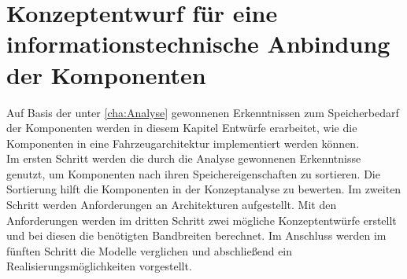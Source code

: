 \chapter{Konzeptentwurf für eine informationstechnische Anbindung der Komponenten} \label{cha:Konzeptentwurf}
Auf Basis der unter \ref{cha:Analyse} gewonnenen Erkenntnissen zum Speicherbedarf der Komponenten werden in diesem Kapitel Entwürfe erarbeitet, wie die Komponenten in eine Fahrzeugarchitektur implementiert werden können.\\
Im ersten Schritt werden die durch die Analyse gewonnenen Erkenntnisse genutzt, um Komponenten nach ihren Speichereigenschaften zu sortieren. Die Sortierung hilft die Komponenten in der Konzeptanalyse zu bewerten. Im zweiten Schritt werden Anforderungen an Architekturen aufgestellt. Mit den Anforderungen werden im dritten Schritt zwei mögliche Konzeptentwürfe erstellt und bei diesen die benötigten Bandbreiten berechnet. Im Anschluss werden im fünften Schritt die Modelle verglichen und abschließend ein Realisierungsmöglichkeiten vorgestellt.
